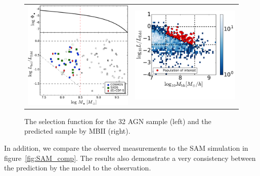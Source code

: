 \documentclass{natureprintstyle}
\begin{document}
\begin{figure}[t]
\begin{tabular}{c c}
\includegraphics[width=0.5\linewidth]{hst_sample_bhmf.pdf}&
\includegraphics[width=0.5\linewidth]{MBII_selectfunc.pdf} \\
\end{tabular}
\caption{The selection function for the 32 AGN sample (left) and the predicted sample by MBII (right).
}
\label{fig:selectfunc}
\end{figure}

In addition, we compare the observed measurements to the SAM simulation in figure~\ref{fig:SAM_comp}. The results also demonstrate a very consistency between the prediction by the model to the observation.
\end{document}
